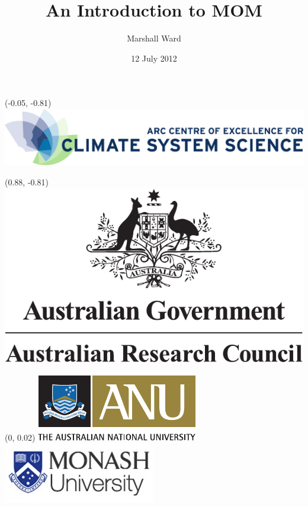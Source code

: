 \documentclass{beamer}
\title{An Introduction to MOM}
\author{Marshall Ward}
\institute{Australian National University\\Research School of Earth Sciences}
\date{12 July 2012}
\begin{document}
\begin{frame}
    \titlepage
    \begin{textblock*}{0.5\textwidth}(-0.05\textwidth, -0.81\textheight)
        \includegraphics[width=\textwidth]{coecms_logo.pdf}
    \end{textblock*}
    \begin{textblock*}{0.15\textwidth}(0.88\textwidth, -0.81\textheight)
        \includegraphics[width=\textwidth]{arc_logo.pdf}
    \end{textblock*}
    \begin{textblock*}{\textwidth}(0\textwidth, 0.02\textheight)
        \includegraphics[height=0.063\textheight]{anu_logo.pdf}
        \hspace{0.02\textwidth}
        \includegraphics[height=0.063\textheight]{monash_logo.png}
        \hspace{0.02\textwidth}

\end{textblock*}
\end{frame}
\end{document}
